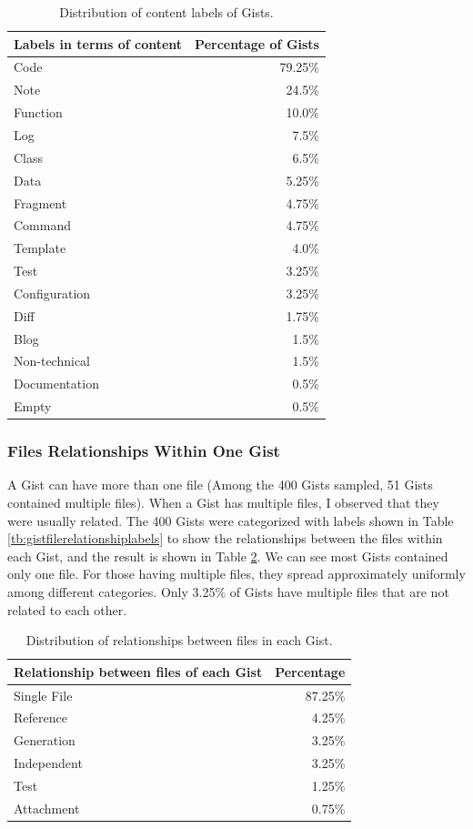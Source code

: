 \begin{table}[!htb]
 \begin{center}
 \begin{tabular}{@{}lr} \hline
    \textbf{Labels in terms of content}	&	\textbf{Percentage of Gists} \\ \hline
	Code & 79.25\%\\
	Note & 24.5\%\\
	Function & 10.0\%\\
	Log & 7.5\%\\
	Class & 6.5\%\\
	Data & 5.25\%\\
	Fragment & 4.75\%\\
	Command & 4.75\%\\
	Template & 4.0\%\\
	Test & 3.25\%\\
	Configuration & 3.25\%\\
	Diff & 1.75\%\\
	Blog & 1.5\%\\
	Non-technical & 1.5\%\\
	Documentation & 0.5\%\\
	Empty & 0.5\%\\ \hline
 \end{tabular}
 \end{center}
 \caption{Distribution of content labels of Gists.}
 \label{tb:labels}
\end{table}

\subsubsection{Files Relationships Within One Gist}
A Gist can have more than one file (Among the 400 Gists sampled, 51 Gists contained multiple files). When a Gist has multiple files, I observed that they were usually related. The 400 Gists were categorized with labels shown in Table \ref{tb:gistfilerelationshiplabels} to show the relationships between the files within each Gist, and the result is shown in Table \ref{tb:relationship}. We can see most Gists contained only one file. For those having multiple files, they spread approximately uniformly among different categories. Only 3.25\% of Gists have multiple files that are not related to each other. 

\begin{table}[!htb]
 \begin{center}
 \begin{tabular}{lr}
    \textbf{Relationship between files of each Gist}	&	\textbf{Percentage} \\ \hline
	Single File & 87.25\%\\
	Reference & 4.25\%\\
	Generation & 3.25\%\\
	Independent & 3.25\%\\
	Test & 1.25\%\\
	Attachment & 0.75\%\\ \hline
 \end{tabular}
 \end{center}
 \caption{Distribution of relationships between files in each Gist.}
 \label{tb:relationship}
\end{table}